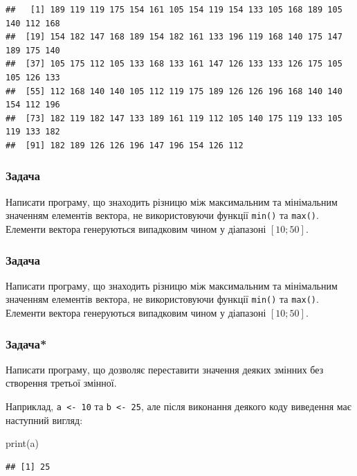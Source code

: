 \documentclass[
]{book}
\newenvironment{Shaded}{\begin{snugshade}}{\end{snugshade}}
\newcommand{\FunctionTok}[1]{\textcolor[rgb]{0.00,0.00,0.00}{#1}}
\newcommand{\NormalTok}[1]{#1}
\begin{document}
\begin{verbatim}
##   [1] 189 119 119 175 154 161 105 154 119 154 133 105 168 189 105 140 112 168
##  [19] 154 182 147 168 189 154 182 161 133 196 119 168 140 175 147 189 175 140
##  [37] 105 175 112 105 133 168 133 161 147 126 133 133 126 175 105 105 126 133
##  [55] 112 168 140 140 105 112 119 175 189 126 126 196 168 140 140 154 112 196
##  [73] 182 119 182 147 133 189 161 119 112 105 140 175 119 133 105 119 133 182
##  [91] 182 189 126 126 196 147 196 154 126 112
\end{verbatim}

\hypertarget{task6121}{%
\subsubsection{Задача}\label{task6121}}

Написати програму, що знаходить різницю між максимальним та мінімальним значенням елементів вектора, не використовуючи функції \texttt{min()} та \texttt{max()}. Елементи вектора генеруються випадковим чином у діапазоні \([10;50]\).

\hypertarget{task61211}{%
\subsubsection{Задача}\label{task61211}}

Написати програму, що знаходить різницю між максимальним та мінімальним значенням елементів вектора, не використовуючи функції \texttt{min()} та \texttt{max()}. Елементи вектора генеруються випадковим чином у діапазоні \([10;50]\).

\hypertarget{task6122}{%
\subsubsection{Задача*}\label{task6122}}

Написати програму, що дозволяє переставити значення деяких змінних без створення третьої змінної.

Наприклад, \texttt{a\ \textless{}-\ 10} та \texttt{b\ \textless{}-\ 25}, але після виконання деякого коду виведення має наступний вигляд:

\begin{Shaded}
\begin{Highlighting}[]
\FunctionTok{print}\NormalTok{(a)}
\end{Highlighting}
\end{Shaded}

\begin{verbatim}
## [1] 25
\end{verbatim}
\end{document}
